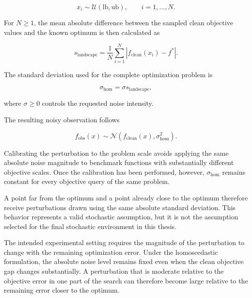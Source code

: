\begin{equation}
x_i \sim \mathcal{U}(\mathrm{lb},\mathrm{ub}),
\qquad i = 1,\ldots,N.
\end{equation}

For $N\geq1$, the mean absolute difference between the sampled clean objective values and
the known optimum is then calculated as

\begin{equation}
s_{\mathrm{landscape}}
=
\frac{1}{N}
\sum_{i=1}^{N}
\left|
f_{\mathrm{clean}}(x_i) - f^*
\right|.
\label{eq:landscape_scale}
\end{equation}

The standard deviation used for the complete optimization problem is

\begin{equation}
\sigma_{\mathrm{hom}}
=
\sigma s_{\mathrm{landscape}},
\label{eq:homoscedastic_std}
\end{equation}

where $\sigma\geq0$ controls the requested noise intensity.

The resulting noisy observation follows

\begin{equation}
f_{\mathrm{obs}}(x)
\sim
\mathcal{N}
\left(
f_{\mathrm{clean}}(x),
\sigma_{\mathrm{hom}}^2
\right).
\label{eq:homoscedastic_noise}
\end{equation}

Calibrating the perturbation to the problem scale avoids applying the same
absolute noise magnitude to benchmark functions with substantially different
objective scales. Once the calibration has been performed, however,
$\sigma_{\mathrm{hom}}$ remains constant for every objective query of the same
problem.

A point far from the optimum and a point already close to the optimum
therefore receive perturbations drawn using the same absolute standard
deviation. This behavior represents a valid stochastic assumption, but it is
not the assumption selected for the final stochastic environment in this
thesis.

The intended experimental setting requires the magnitude of the perturbation
to change with the remaining optimization error. Under the homoscedastic
formulation, the absolute noise level remains fixed even when the clean
objective gap changes substantially. A perturbation that is moderate relative
to the objective error in one part of the search can therefore become large
relative to the remaining error closer to the optimum.


